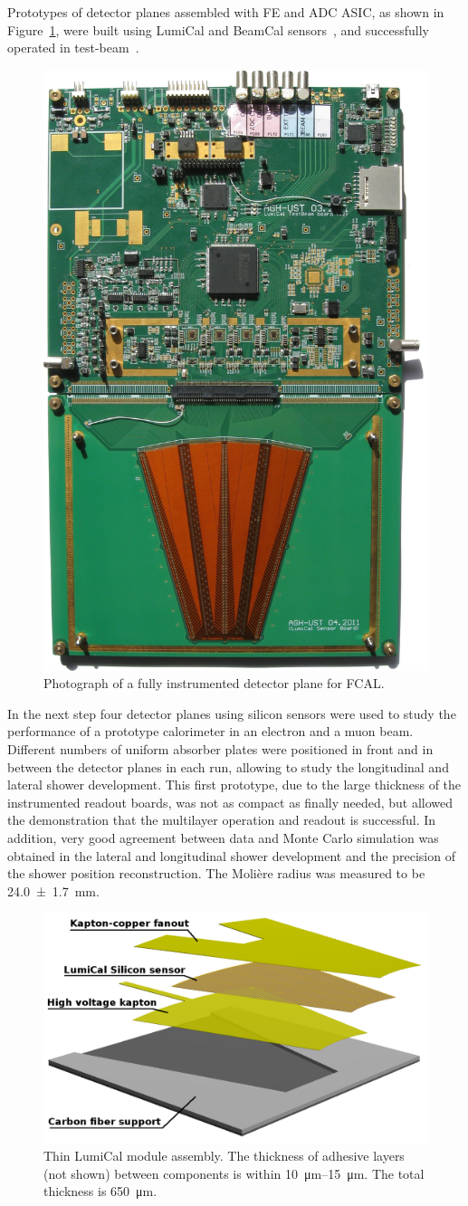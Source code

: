 Prototypes of detector planes assembled with FE and ADC ASIC,
as shown in Figure~\ref{fig:fcal_lumical_module_photo},
were built using LumiCal and BeamCal sensors~\cite{1748-0221-7-01-T01004}, and successfully operated in 
test-beam~\cite{Abramowicz:2014gdq}.
\begin{figure}
    \centering
    \includegraphics[width=0.35\columnwidth,angle=90]{Calorimeter/FCAL/figs/tb3_complete_module}
    \caption{Photograph of a fully instrumented detector plane for FCAL.}
    \label{fig:fcal_lumical_module_photo}
\end{figure}
In the next step four detector planes using silicon sensors were used to
study the performance of a prototype calorimeter in an electron and a muon beam. Different numbers of uniform
absorber plates were positioned in front and in between the detector planes in each
run, allowing to study the longitudinal and lateral shower development.
This first prototype, due to the large thickness of the instrumented readout boards, was not as compact as finally needed, but
allowed the demonstration that the multilayer operation and readout is successful. In addition, very good
agreement between data and Monte Carlo simulation
was obtained in the lateral and longitudinal shower development and the precision of the shower position reconstruction. The Moli\`ere 
radius was measured to be \SI{24.0(17)}{mm}.
\begin{figure}
    \includegraphics[width=0.99\columnwidth]{Calorimeter/FCAL/figs/lc_assembly_1.png}
    \caption{Thin LumiCal module assembly. The thickness of adhesive layers (not shown) between components is within \SIrange{10}{15}{\micro\meter}. The total thickness is \SI{650}{\micro\meter}.}
    \label{fig_ThinLCAssembly}
\end{figure}

